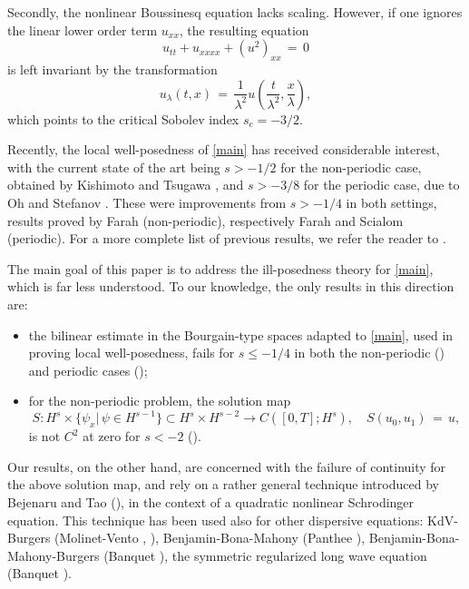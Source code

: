 \documentclass{amsart}
\begin{document}
Secondly, the nonlinear Boussinesq equation lacks scaling. However, if one ignores the linear lower order term $u_{xx}$, the resulting equation 
\begin{equation}
u_{tt}+u_{xxxx}+(u^2)_{xx}\,=\,0\label{new}
\end{equation}
is left invariant by the transformation
\[
u_{\lambda}(t,x)\,=\,\frac{1}{\lambda^2}u\left(\frac{t}{\lambda^2}, \frac{x}{\lambda}\right),
\]
which points to the critical Sobolev index $s_c=-3/2$.

Recently, the local well-posedness of \eqref{main} has received considerable interest, with the current state of the art being $s>-1/2$ for the non-periodic case, obtained by Kishimoto and Tsugawa \cite{KT10}, and $s>-3/8$ for the periodic case, due to Oh and Stefanov \cite{OS12}. These were improvements from $s>-1/4$ in both settings, results proved by  Farah \cite{F09} (non-periodic), respectively Farah and Scialom \cite{FS10} (periodic). For a more complete list of previous results, we refer the reader to \cite{OS12}.

The main goal of this paper is to address the ill-posedness theory for \eqref{main}, which is far less understood. To our knowledge, the only results in this direction are:

\begin{itemize}

\item the bilinear estimate in the Bourgain-type spaces adapted to \eqref{main}, used in proving local well-posedness, fails for $s\leq -1/4$ in both the non-periodic (\cite{F09}) and periodic cases (\cite{FS10});

\item for the non-periodic problem, the solution map 
\[
S: H^s\times \{\psi_x |\,\psi\in H^{s-1}\}\subset H^s\times H^{s-2} \to C([0,T]; H^s), \quad
S(u_0,u_1)\,=\,u,
\]
is not $C^2$ at zero for $s<-2$ (\cite{F09}).
\end{itemize}

Our results, on the other hand, are concerned with the failure of continuity for the above solution map, and rely on a rather general technique introduced by Bejenaru and Tao (\cite{BT06}), in the context of a quadratic nonlinear Schrodinger equation. This technique has been used also for other dispersive equations: KdV-Burgers (Molinet-Vento \cite{MV09}, \cite{MV10}), Benjamin-Bona-Mahony (Panthee \cite{P11}), Benjamin-Bona-Mahony-Burgers (Banquet \cite{B11}), the symmetric regularized long wave equation (Banquet \cite{B12}). 
\end{document}
